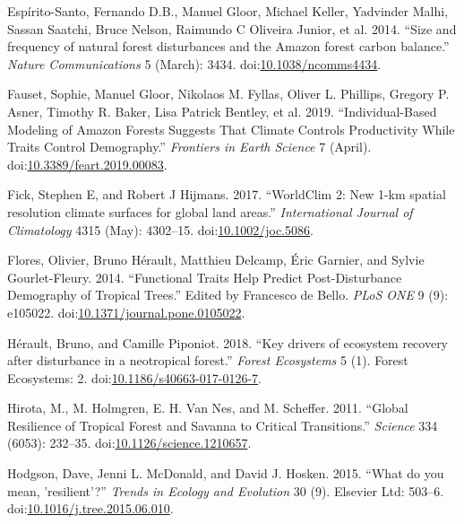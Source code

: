 \documentclass[]{elsarticle} %
\begin{document}
\hypertarget{ref-Espirito-Santo2014}{}
Espírito-Santo, Fernando D.B., Manuel Gloor, Michael Keller, Yadvinder
Malhi, Sassan Saatchi, Bruce Nelson, Raimundo C Oliveira Junior, et al.
2014. ``Size and frequency of natural forest disturbances and the Amazon
forest carbon balance.'' \emph{Nature Communications} 5 (March): 3434.
doi:\href{https://doi.org/10.1038/ncomms4434}{10.1038/ncomms4434}.

\hypertarget{ref-Fauset2019}{}
Fauset, Sophie, Manuel Gloor, Nikolaos M. Fyllas, Oliver L. Phillips,
Gregory P. Asner, Timothy R. Baker, Lisa Patrick Bentley, et al. 2019.
``Individual-Based Modeling of Amazon Forests Suggests That Climate
Controls Productivity While Traits Control Demography.'' \emph{Frontiers
in Earth Science} 7 (April).
doi:\href{https://doi.org/10.3389/feart.2019.00083}{10.3389/feart.2019.00083}.

\hypertarget{ref-Fick2017}{}
Fick, Stephen E, and Robert J Hijmans. 2017. ``WorldClim 2: New 1-km
spatial resolution climate surfaces for global land areas.''
\emph{International Journal of Climatology} 4315 (May): 4302--15.
doi:\href{https://doi.org/10.1002/joc.5086}{10.1002/joc.5086}.

\hypertarget{ref-Flores2014}{}
Flores, Olivier, Bruno Hérault, Matthieu Delcamp, Éric Garnier, and
Sylvie Gourlet-Fleury. 2014. ``Functional Traits Help Predict
Post-Disturbance Demography of Tropical Trees.'' Edited by Francesco de
Bello. \emph{PLoS ONE} 9 (9): e105022.
doi:\href{https://doi.org/10.1371/journal.pone.0105022}{10.1371/journal.pone.0105022}.

\hypertarget{ref-Herault2018}{}
Hérault, Bruno, and Camille Piponiot. 2018. ``Key drivers of ecosystem
recovery after disturbance in a neotropical forest.'' \emph{Forest
Ecosystems} 5 (1). Forest Ecosystems: 2.
doi:\href{https://doi.org/10.1186/s40663-017-0126-7}{10.1186/s40663-017-0126-7}.

\hypertarget{ref-Hirota2011}{}
Hirota, M., M. Holmgren, E. H. Van Nes, and M. Scheffer. 2011. ``Global
Resilience of Tropical Forest and Savanna to Critical Transitions.''
\emph{Science} 334 (6053): 232--35.
doi:\href{https://doi.org/10.1126/science.1210657}{10.1126/science.1210657}.

\hypertarget{ref-Hodgson2015}{}
Hodgson, Dave, Jenni L. McDonald, and David J. Hosken. 2015. ``What do
you mean, 'resilient'?'' \emph{Trends in Ecology and Evolution} 30 (9).
Elsevier Ltd: 503--6.
doi:\href{https://doi.org/10.1016/j.tree.2015.06.010}{10.1016/j.tree.2015.06.010}.
\end{document}
